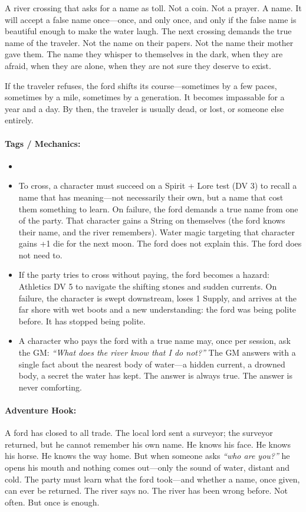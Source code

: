 A river crossing that asks for a name as toll. Not a coin. Not a prayer. A name. It will accept a false name once—once, and only once, and only if the false name is beautiful enough to make the water laugh. The next crossing demands the true name of the traveler. Not the name on their papers. Not the name their mother gave them. The name they whisper to themselves in the dark, when they are afraid, when they are alone, when they are not sure they deserve to exist.

If the traveler refuses, the ford shifts its course—sometimes by a few paces, sometimes by a mile, sometimes by a generation. It becomes impassable for a year and a day. By then, the traveler is usually dead, or lost, or someone else entirely.

\paragraph{Tags / Mechanics:}
\begin{itemize}
\item [THRESHOLD] [TRUTH] [SACRIFICE]
\item To cross, a character must succeed on a Spirit + Lore test (DV 3) to recall a name that has meaning—not necessarily their own, but a name that cost them something to learn. On failure, the ford demands a true name from one of the party. That character gains a String on themselves (the ford knows their name, and the river remembers). Water magic targeting that character gains +1 die for the next moon. The ford does not explain this. The ford does not need to.
\item If the party tries to cross without paying, the ford becomes a hazard: Athletics DV 5 to navigate the shifting stones and sudden currents. On failure, the character is swept downstream, loses 1 Supply, and arrives at the far shore with wet boots and a new understanding: the ford was being polite before. It has stopped being polite.
\item A character who pays the ford with a true name may, once per session, ask the GM: \textit{``What does the river know that I do not?''} The GM answers with a single fact about the nearest body of water—a hidden current, a drowned body, a secret the water has kept. The answer is always true. The answer is never comforting.
\end{itemize}

\paragraph{Adventure Hook:}
A ford has closed to all trade. The local lord sent a surveyor; the surveyor returned, but he cannot remember his own name. He knows his face. He knows his horse. He knows the way home. But when someone asks \textit{``who are you?''} he opens his mouth and nothing comes out—only the sound of water, distant and cold. The party must learn what the ford took—and whether a name, once given, can ever be returned. The river says no. The river has been wrong before. Not often. But once is enough.

